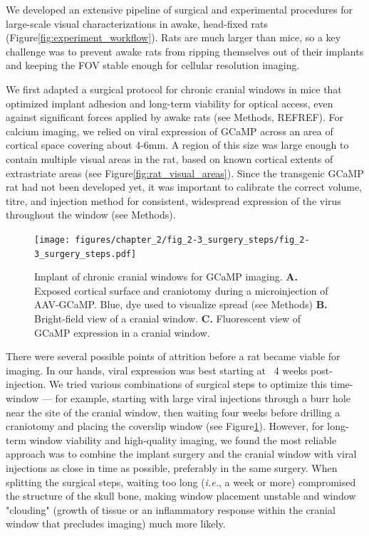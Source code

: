 We developed an extensive pipeline of surgical and experimental procedures for large-scale visual characterizations in awake, head-fixed rats (Figure\ref{fig:experiment_workflow}). Rats are much larger than mice, so a key challenge was to prevent awake rats from ripping themselves out of their implants and keeping the FOV stable enough for cellular resolution imaging. 


We first adapted a surgical protocol for chronic cranial windows in mice \cite{Goldey2014} that optimized implant adhesion and long-term viability for optical access, even against significant forces applied by awake rats (see Methods, REFREF). For calcium imaging, we relied on viral expression of GCaMP across an area of cortical space covering about 4-6mm. A region of this size was large enough to contain multiple visual areas in the rat, based on known cortical extents of extrastriate areas (see Figure\ref{fig:rat_visual_areas}). Since the transgenic GCaMP rat \cite{Scott2018ImagingMacroscope} had not been developed yet, it was important to calibrate the correct volume, titre, and injection method for consistent, widespread expression of the virus throughout the window (see Methods). 

\begin{figure}[t!]
    \texttt{[image: figures/chapter\_2/fig\_2-3\_surgery\_steps/fig\_2-3\_surgery\_steps.pdf]}
    \vspace{.1in}
    \caption[Chronic cranial window]{Implant of chronic cranial windows for GCaMP imaging. \textbf{A.} Exposed cortical surface and craniotomy during a microinjection of AAV-GCaMP. Blue, dye used to visualize spread (see Methods) \textbf{B.} Bright-field view of a cranial window. \textbf{C.} Fluorescent view of GCaMP expression in a cranial window.
    \label{fig:surgery_steps}}
\end{figure}

There were several possible points of attrition before a rat became viable for imaging. In our hands, viral expression was best starting at ~4 weeks post-injection. We tried various combinations of surgical steps to optimize this time-window --- for example, starting with large viral injections through a burr hole near the site of the cranial window, then waiting four weeks before drilling a craniotomy and placing the coverslip window (see Figure\ref{fig:surgery_steps}). However, for long-term window viability and high-quality imaging, we found the most reliable approach was to combine the implant surgery and the cranial window with viral injections as close in time as possible, preferably in the same surgery. When splitting the surgical steps, waiting too long (\textit{i.e.}, a week or more) compromised the structure of the skull bone, making window placement unstable and window "clouding" (growth of tissue or an inflammatory response within the cranial window that precludes imaging) much more likely. 

